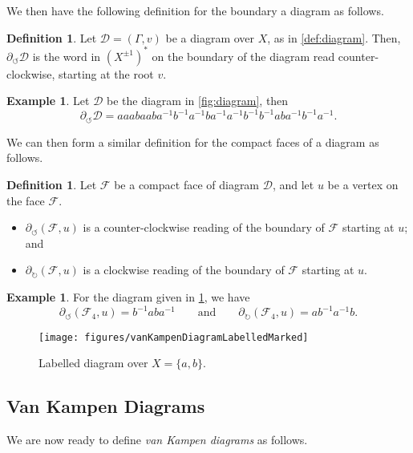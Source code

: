 \documentclass[11pt,a4paper,reqno]{amsart}
\theoremstyle{plain}
\theoremstyle{definition}
\newtheorem{definition}[theorem]{Definition}
\theoremstyle{definition}
\newtheorem{example}[theorem]{Example}
\begin{document}
We then have the following definition for the boundary a diagram as follows.

\begin{definition}\label{def:boundary-of-diagram}
Let $\mathcal D = (\Gamma, v)$ be a diagram over $X$, as in \cref{def:diagram}.
Then, $\partial_{\circlearrowleft} \mathcal D$ is the word in $(X^{\pm 1})^*$ on the boundary of the diagram read counter-clockwise, starting at the root $v$.
\end{definition}

\begin{example}
Let $\mathcal D$ be the diagram in \cref{fig:diagram}, then \[\partial_{\circlearrowleft} \mathcal D = aaabaaba^{-1}b^{-1}a^{-1}ba^{-1}a^{-1}b^{-1}b^{-1}aba^{-1}b^{-1}a^{-1}.\]
\end{example}

We can then form a similar definition for the compact faces of a diagram as follows.

\begin{definition}\label{def:boundary-of-face}
  Let $\mathcal F$ be a compact face of diagram $\mathcal D$, and let $u$ be a vertex on the face $\mathcal F$.
  \begin{itemize}[leftmargin=2em]
    \item $\partial_{\circlearrowleft} (\mathcal F,u)$ is a counter-clockwise reading of the boundary of $\mathcal F$ starting at $u$; and
    \item $\partial_{\circlearrowright} (\mathcal F,u)$ is a clockwise reading of the boundary of $\mathcal F$ starting at $u$.
  \end{itemize}
\end{definition}

\begin{example}
  For the diagram given in \cref{fig:diagram-labeled}, we have
  \[
    \partial_{\circlearrowleft} (\mathcal F_4,u) = b^{-1}a b a^{-1}
    \qquad\text{and}\qquad
    \partial_{\circlearrowright} (\mathcal F_4,u) =ab^{-1}a^{-1}b.
  \]
\end{example}

\begin{figure}[ht!]
	\centering
  \texttt{[image: figures/vanKampenDiagramLabelledMarked]}
	\caption{Labelled diagram over $X = \{a,b\}$.}\label{fig:diagram-labeled}
\end{figure}

\subsection{Van Kampen Diagrams}
We are now ready to define \emph{van Kampen diagrams} as follows.
\end{document}
